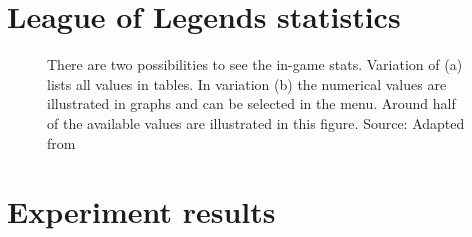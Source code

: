\chapter{League of Legends statistics}\label{app:lol_stats}
\begin{figure}[H]
	\centering
	\qquad
	\label{fig:lol_stats}
	\caption[League of Legends: Post-Game Statistics]{There are two possibilities to see the in-game stats. Variation of (a) lists all values in tables. In variation (b) the numerical values are illustrated in graphs and can be selected in the menu. Around half of the available values are illustrated in this figure. Source: Adapted from \cite{LeagueClient} }
\end{figure}


\chapter{Experiment results}
\begin{table}[H]
	\caption[Average results of agents with respect to sub-tasks] {Average results of agents with respect to sub-tasks}
	\centering
	\label{tab:eva2}
\end{table} 

